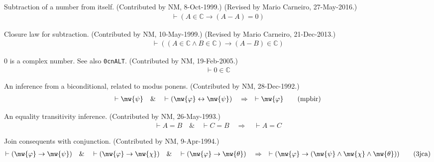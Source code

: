 \begin{lemma} Subtraction of a number from itself. 
(Contributed by NM, 8-Oct-1999.)
     (Revised by Mario Carneiro, 27-May-2016.)
\begin{align}
\vdash ( A \in \mathbb{C} \rightarrow ( A \minus A ) = 0
    )\label{eq:subid}\tag{subid}
\end{align}
\end{lemma}


\begin{lemma} Closure law for subtraction.  (Contributed by
NM, 10-May-1999.)
       (Revised by Mario Carneiro, 21-Dec-2013.)
\begin{align}
\vdash ( ( A \in \mathbb{C} \wedge B \in \mathbb{C} ) \rightarrow ( A \minus B
    ) \in \mathbb{C} )\label{eq:subcl}\tag{subcl}
\end{align}
\end{lemma}


\begin{lemma} 0 is a complex number.  See also {\tt 0cnALT}. 
(Contributed by NM,
     19-Feb-2005.)
\begin{align}
\vdash 0 \in \mathbb{C}\label{eq:0cn}\tag{0cn}
\end{align}
\end{lemma}


\begin{lemma} An inference from a biconditional, related to
modus ponens.
       (Contributed by NM, 28-Dec-1992.)
\begin{align}
\vdash \mw{\psi}\quad\&\quad \vdash ( \mw{\varphi} \leftrightarrow \mw{\psi}
    )\quad\Rightarrow\quad \vdash \mw{\varphi}\label{eq:mpbir}\tag{mpbir}
\end{align}
\end{lemma}


\begin{lemma} An equality transitivity inference. 
(Contributed by NM,
       26-May-1993.)
\begin{align}
\vdash A = B\quad\&\quad \vdash C = B\quad\Rightarrow\quad \vdash A =
    C\label{eq:eqtr4i}\tag{eqtr4i}
\end{align}
\end{lemma}


\begin{lemma} Join consequents with conjunction. 
(Contributed by NM, 9-Apr-1994.)
\begin{align}
\vdash ( \mw{\varphi} \rightarrow \mw{\psi} )\quad\&\quad \vdash ( \mw{\varphi}
    \rightarrow \mw{\chi} )\quad\&\quad \vdash ( \mw{\varphi} \rightarrow
    \mw{\theta} )\quad\Rightarrow\quad \vdash ( \mw{\varphi} \rightarrow (
    \mw{\psi} \wedge \mw{\chi} \wedge \mw{\theta} ) )\label{eq:3jca}\tag{3jca}
\end{align}
\end{lemma}


